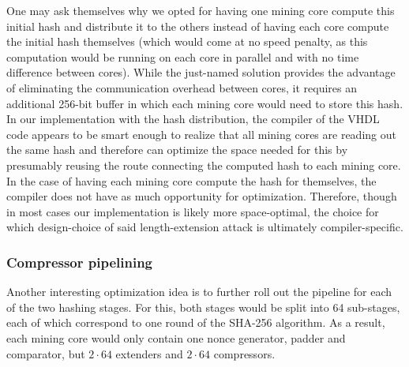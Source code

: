 One may ask themselves why we opted for having one mining core compute this initial hash and distribute it to the others instead of having each core compute the initial hash themselves (which would come at no speed penalty, as this computation would be running on each core in parallel and with no time difference between cores). While the just-named solution provides the advantage of eliminating the communication overhead between cores, it requires an additional 256-bit buffer in which each mining core would need to store this hash. \newline
In our implementation with the hash distribution, the compiler of the VHDL code appears to be smart enough to realize that all mining cores are reading out the same hash and therefore can optimize the space needed for this by presumably reusing the route connecting the computed hash to each mining core. In the case of having each mining core compute the hash for themselves, the compiler does not have as much opportunity for optimization. Therefore, though in most cases our implementation is likely more space-optimal, the choice for which design-choice of said length-extension attack is ultimately compiler-specific. 




\subsubsection{Compressor pipelining}

Another interesting optimization idea is to further roll out the pipeline for each of the two hashing stages. For this, both stages would be split into 64 sub-stages, each of which correspond to one round of the SHA-256 algorithm. As a result, each mining core would only contain one nonce generator, padder and comparator, but $2 \cdot 64$ extenders and $2 \cdot 64$ compressors.

